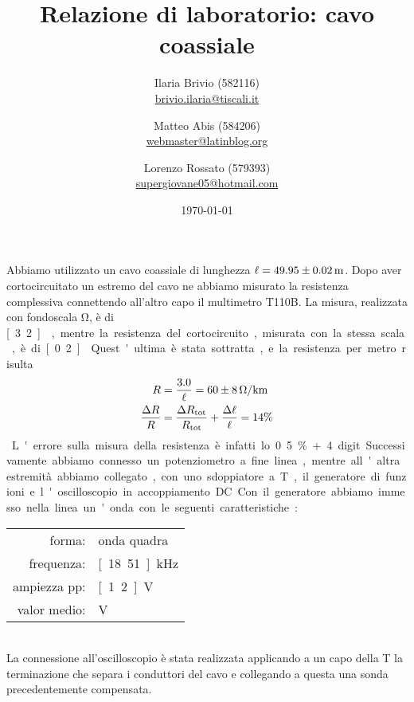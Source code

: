 \documentclass[italian,a4paper]{article}
\begin{document}
\title{Relazione di laboratorio: cavo coassiale}
\author{\normalsize Ilaria Brivio (582116)\\%
\normalsize \url{brivio.ilaria@tiscali.it}%
\and %
\normalsize Matteo Abis (584206)\\ %
\normalsize \url{webmaster@latinblog.org}
\and %
\normalsize Lorenzo Rossato (579393)\\ %
\normalsize \url{supergiovane05@hotmail.com}}
\date{\today}
\maketitle
\noindent
Abbiamo utilizzato un cavo coassiale di lunghezza $\ell=\unit[49.95 \pm 0.02]{m}$.
%
Dopo aver cortocircuitato un estremo del cavo ne abbiamo misurato la
resistenza complessiva connettendo all'altro capo il multimetro T110B. La
misura, realizzata con fondoscala \unit[200]{\ohm}, è di \unit[3.2]{\ohm},
mentre la resistenza del cortocircuito, misurata con la stessa scala, è di
\unit[0.2]{\ohm}. Quest'ultima è stata sottratta, e la resistenza per metro
risulta
\begin{align*}
R &= \dfrac{3.0}{\ell}=\unit[60 \pm 8]{\ohm/km} \\
\dfrac{\Delta R}{R} &= \dfrac{\Delta R_{\text{tot}}}{R_{\text{tot}}} +
\dfrac{\Delta \ell}{\ell} = 14\% \end{align*}
L'errore sulla misura della resistenza è infatti lo 0.5\% + 4 digit.
%
Successivamente abbiamo connesso un potenziometro a fine linea, mentre all'altra estremità abbiamo collegato, con uno sdoppiatore a T, il generatore di funzioni e l'oscilloscopio in accoppiamento DC.
Con il generatore abbiamo immesso nella linea un'onda con le seguenti
caratteristiche:
\begin{table}[h]
    \centering
    \begin{tabular}{rl}
        forma: & onda quadra\\
        frequenza: & \unit[18.51]{kHz}\\
        ampiezza pp: & \unit[1.2]{V}\\
        valor medio: & \unit[0]{V}
    \end{tabular}
\end{table}\\
La connessione all'oscilloscopio è stata realizzata applicando a un capo della T la terminazione che separa i conduttori del cavo e collegando a questa una sonda precedentemente compensata.
\end{document}
